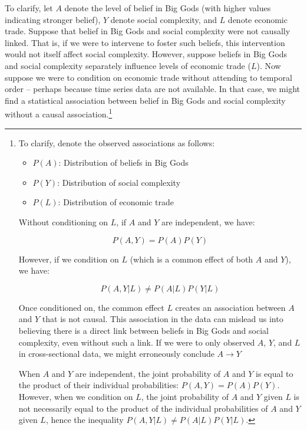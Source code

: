 \documentclass[
  singlecolumn]{article}
\providecommand{\tightlist}{%
  \setlength{\itemsep}{0pt}\setlength{\parskip}{0pt}}\usepackage{longtable,booktabs,array}
\begin{document}
To clarify, let \(A\) denote the level of belief in Big Gods (with
higher values indicating stronger belief), \(Y\) denote social
complexity, and \(L\) denote economic trade. Suppose that belief in Big
Gods and social complexity were not causally linked. That is, if we were
to intervene to foster such beliefs, this intervention would not itself
affect social complexity. However, suppose beliefs in Big Gods and
social complexity separately influence levels of economic trade (\(L\)).
Now suppose we were to condition on economic trade without attending to
temporal order -- perhaps because time series data are not available. In
that case, we might find a statistical association between belief in Big
Gods and social complexity without a causal association.\footnote{To
  clarify, denote the observed associations as follows:

  \begin{itemize}
  \tightlist
  \item
    \(P(A)\): Distribution of beliefs in Big Gods
  \item
    \(P(Y)\): Distribution of social complexity
  \item
    \(P(L)\): Distribution of economic trade
  \end{itemize}

  Without conditioning on \(L\), if \(A\) and \(Y\) are independent, we
  have:

  \[P(A, Y) = P(A)P(Y)\]

  However, if we condition on \(L\) (which is a common effect of both
  \(A\) and \(Y\)), we have:

  \[P(A, Y | L) \neq P(A | L)P(Y | L)\]

  Once conditioned on, the common effect \(L\) creates an association
  between \(A\) and \(Y\) that is not causal. This association in the
  data can mislead us into believing there is a direct link between
  beliefs in Big Gods and social complexity, even without such a link.
  If we were to only observed \(A\), \(Y\), and \(L\) in cross-sectional
  data, we might erroneously conclude \(A \to Y\)

  When \(A\) and \(Y\) are independent, the joint probability of \(A\)
  and \(Y\) is equal to the product of their individual probabilities:
  \(P(A, Y) = P(A)P(Y)\). However, when we condition on \(L\), the joint
  probability of \(A\) and \(Y\) given \(L\) is not necessarily equal to
  the product of the individual probabilities of \(A\) and \(Y\) given
  \(L\), hence the inequality \(P(A, Y | L) \neq P(A | L)P(Y | L)\).}
\end{document}
